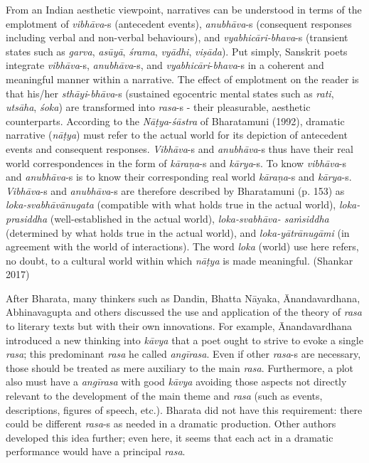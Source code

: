 \begin{myquote}
From an Indian aesthetic viewpoint, narratives can be understood in terms of the emplotment of \textsl{vibhāva}-s (antecedent events), \textsl{anubhāva}-s (consequent responses including verbal and non-verbal behaviours), and \textsl{vyabhicāri-bhava}-s (transient states such as \textsl{garva}, \textsl{asūyā}, \textsl{śrama}, \textsl{vyādhi}, \textsl{viṣāda}). Put simply, Sanskrit poets integrate \textsl{vibhāva}-s, \textsl{anubhāva}-s, and \textsl{vyabhicāri}-\textsl{bhava}-s in a coherent and meaningful manner within a narrative. The effect of emplotment on the reader is that his/her \textsl{sthāyi}-\textsl{bhāva}-s (sustained egocentric mental states such as \textsl{rati}, \textsl{utsāha}, \textsl{śoka}) are transformed into \textsl{rasa}-s - their pleasurable, aesthetic counterparts. According to the \textsl{Nāṭya}-\textsl{śāstra} of Bharatamuni (1992), dramatic narrative (\textsl{nāṭya}) must refer to the actual world for its depiction of antecedent events and consequent responses. \textsl{Vibhāva}-s and \textsl{anubhāva}-s thus have their real world correspondences in the form of \textsl{kāraṇa}-s and \textsl{kārya}-s. To know \textsl{vibhāva}-s and \textsl{anubhāva}-s is to know their corresponding real world \textsl{kāraṇa}-s and \textsl{kārya}-s. \textsl{Vibhāva}-s and \textsl{anubhāva}-s are therefore described by Bharatamuni (p. 153) as \textsl{loka-svabhāvānugata} (compatible with what holds true in the actual world), \textsl{loka-prasiddha} (well-established in the actual world), \textsl{loka-svabhāva- saṁsiddha} (determined by what holds true in the actual world), and \textsl{loka-yātrānugāmi} (in agreement with the world of interactions). The word \textsl{loka} (world) use here refers, no doubt, to a cultural world within which \textsl{nāṭya} is made meaningful. 
\hfill(Shankar 2017) 
\end{myquote}

After Bharata, many thinkers such as Dandin, Bhatta Nāyaka, Ānandavardhana, Abhinavagupta and others discussed the use and application of the theory of \textsl{rasa} to literary texts but with their own innovations. For example, Ānandavardhana introduced a new thinking into \textsl{kāvya} that a poet ought to strive to evoke a single \textsl{rasa}; this predominant \textsl{rasa} he called \textsl{angīrasa}. Even if other \textsl{rasa}-s are necessary, those should be treated as mere auxiliary to the main \textsl{rasa}. Furthermore, a plot also must have a \textsl{angīrasa} with good \textsl{kāvya} avoiding those aspects not directly relevant to the development of the main theme and \textsl{rasa} (such as events, descriptions, figures of speech, etc.). Bharata did not have this requirement: there could be different \textsl{rasa}-s as needed in a dramatic production. Other authors developed this idea further; even here, it seems that each act in a dramatic performance would have a principal \textsl{rasa}. 

